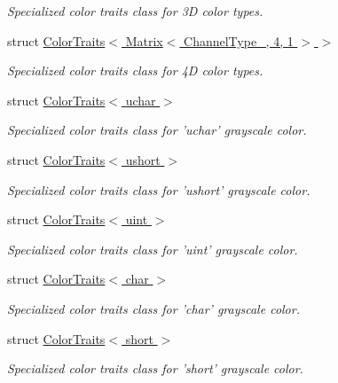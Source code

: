 \begin{DoxyCompactItemize}
\begin{DoxyCompactList}\small\item\em Specialized color traits class for 3\-D color types. \end{DoxyCompactList}\item 
struct \hyperlink{struct_d_o_1_1_color_traits_3_01_matrix_3_01_channel_type___00_014_00_011_01_4_01_4}{Color\-Traits$<$ Matrix$<$ Channel\-Type\-\_\-, 4, 1 $>$ $>$}
\begin{DoxyCompactList}\small\item\em Specialized color traits class for 4\-D color types. \end{DoxyCompactList}\item 
struct \hyperlink{struct_d_o_1_1_color_traits_3_01uchar_01_4}{Color\-Traits$<$ uchar $>$}
\begin{DoxyCompactList}\small\item\em Specialized color traits class for 'uchar' grayscale color. \end{DoxyCompactList}\item 
struct \hyperlink{struct_d_o_1_1_color_traits_3_01ushort_01_4}{Color\-Traits$<$ ushort $>$}
\begin{DoxyCompactList}\small\item\em Specialized color traits class for 'ushort' grayscale color. \end{DoxyCompactList}\item 
struct \hyperlink{struct_d_o_1_1_color_traits_3_01uint_01_4}{Color\-Traits$<$ uint $>$}
\begin{DoxyCompactList}\small\item\em Specialized color traits class for 'uint' grayscale color. \end{DoxyCompactList}\item 
struct \hyperlink{struct_d_o_1_1_color_traits_3_01char_01_4}{Color\-Traits$<$ char $>$}
\begin{DoxyCompactList}\small\item\em Specialized color traits class for 'char' grayscale color. \end{DoxyCompactList}\item 
struct \hyperlink{struct_d_o_1_1_color_traits_3_01short_01_4}{Color\-Traits$<$ short $>$}
\begin{DoxyCompactList}\small\item\em Specialized color traits class for 'short' grayscale color. \end{DoxyCompactList}\item 

\end{DoxyCompactItemize}
